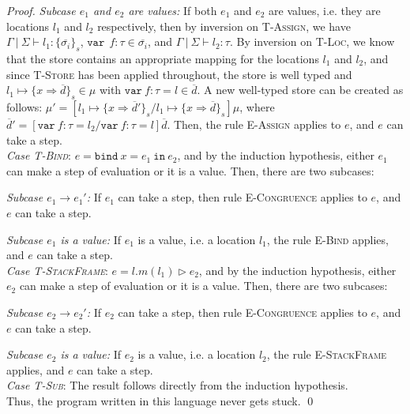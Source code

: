 \documentclass{llncs}
\newcommand{\keywadj}[1]{\mathtt{#1}}
\newcommand{\keyw}[1]{\keywadj{#1}~}
\begin{document}
\begin{proof}
\textit{Subcase $e_1$ and $e_2$ are values:} If both $e_1$ and $e_2$ are values, i.e. they are locations $l_1$ and $l_2$ respectively, then by inversion on \textsc{T-Assign}, we have $\Gamma~|~\Sigma \vdash l_1 : \{ \overline{\sigma_i} \}_s$, $\keyw{var}~ f:\tau \in \overline{\sigma_i}$, and $\Gamma~|~\Sigma \vdash l_2 : \tau$. By inversion on \textsc{T-Loc}, we know that the store contains an appropriate mapping for the locations $l_1$ and $l_2$, and since \textsc{T-Store} has been applied throughout, the store is well typed and $l_1 \mapsto \{ x \Rightarrow \overline{d} \}_{s} \in \mu$ with $\keyw{var} f : \tau = l \in \overline{d}$. A new well-typed store can be created as follows: $\mu' = [l_1 \mapsto \{ x \Rightarrow \overline{d}' \}_{s}/l_1 \mapsto \{ x \Rightarrow \overline{d} \}_{s}]\mu$, where $\overline{d}' = [\keyw{var} f : \tau = l_2/\keyw{var} f : \tau = l]\overline{d}$. Then, the rule \textsc{E-Assign} applies to $e$, and $e$ can take a step.
\\

\noindent\textit{Case \textsc{T-Bind}}:
$e =  \keyw{bind} x = e_1~\keyw{in} e_2$, and by the induction hypothesis, either $e_1$ can make a step of evaluation or it is a value. Then, there are two subcases:

\textit{Subcase $e_1 \longrightarrow e_1'$:} If $e_1$ can take a step, then rule \textsc{E-Congruence} applies to $e$, and $e$ can take a step.

\textit{Subcase $e_1$ is a value:} If $e_1$ is a value, i.e. a location $l_1$, the rule \textsc{E-Bind} applies, and $e$ can take a step.
\\

\noindent\textit{Case \textsc{T-StackFrame}}:
$e = l.m(l_1) \rhd e_2$, and by the induction hypothesis, either $e_2$ can make a step of evaluation or it is a value. Then, there are two subcases:

\textit{Subcase $e_2 \longrightarrow e_2'$:} If $e_2$ can take a step, then rule \textsc{E-Congruence} applies to $e$, and $e$ can take a step.

\textit{Subcase $e_2$ is a value:} If $e_2$ is a value, i.e. a location $l_2$, the rule \textsc{E-StackFrame} applies, and $e$ can take a step.
\\

\noindent\textit{Case \textsc{T-Sub}}:
The result follows directly from the induction hypothesis.
\\

\noindent Thus, the program written in this language never gets stuck. \qed

\end{proof}
\end{document}
